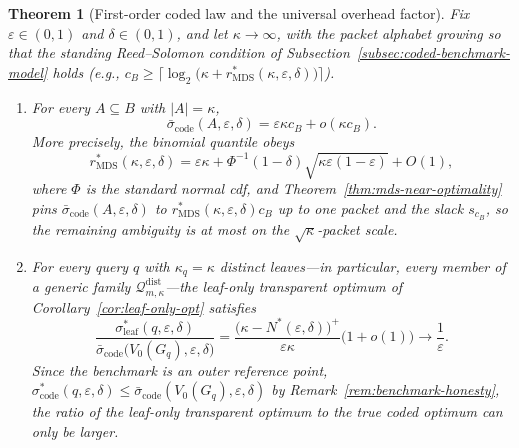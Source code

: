 \documentclass[journal]{IEEEtran}
\newcommand{\Qdist}{\mathcal Q_{m,\kappa}^{\mathrm{dist}}}
\newtheorem{theorem}{Theorem}[section]
\numberwithin{equation}{section}
\begin{document}
\begin{theorem}[First-order coded law and the universal overhead factor]
\label{thm:first-order-overhead-law}
Fix \(\varepsilon\in(0,1)\) and \(\delta\in(0,1)\), and let
\(\kappa\to\infty\), with the packet alphabet growing so that the standing
Reed--Solomon condition of
Subsection~\ref{subsec:coded-benchmark-model} holds (e.g.,
\(c_B\ge\bigl\lceil\log_2\bigl(\kappa+r_{\mathrm{MDS}}^*
(\kappa,\varepsilon,\delta)\bigr)\bigr\rceil\)).
\begin{enumerate}[label=\textup{(\alph*)}]
\item For every \(A\subseteq B\) with \(|A|=\kappa\),
\begin{equation}
  \bar\sigma_{\mathrm{code}}(A,\varepsilon,\delta)
  =
  \varepsilon\kappa c_B+o(\kappa c_B).
\label{eq:first-order-coded}
\end{equation}
More precisely, the binomial quantile obeys
\begin{equation}
  r_{\mathrm{MDS}}^*(\kappa,\varepsilon,\delta)
  =
  \varepsilon\kappa
  +
  \Phi^{-1}(1-\delta)\sqrt{\kappa\varepsilon(1-\varepsilon)}
  +
  O(1),
\label{eq:rstar-second-order}
\end{equation}
where \(\Phi\) is the standard normal cdf, and
Theorem~\ref{thm:mds-near-optimality} pins
\(\bar\sigma_{\mathrm{code}}(A,\varepsilon,\delta)\) to
\(r_{\mathrm{MDS}}^*(\kappa,\varepsilon,\delta)c_B\) up to one packet and the
slack \(s_{c_B}\), so the remaining ambiguity is at most on the
\(\sqrt{\kappa}\)-packet scale.
\item For every query \(q\) with \(\kappa_q=\kappa\) distinct leaves---in
particular, every member of a generic family \(\Qdist\)---the leaf-only
transparent optimum of Corollary~\ref{cor:leaf-only-opt} satisfies
\begin{equation}
  \frac{\sigma_{\mathrm{leaf}}^*(q,\varepsilon,\delta)}
       {\bar\sigma_{\mathrm{code}}\bigl(V_0(G_q),\varepsilon,\delta\bigr)}
  \!=\!
  \frac{\bigl(\kappa\!-\!N^*(\varepsilon,\delta)\bigr)^+}{\varepsilon\kappa}
  \bigl(1+o(1)\bigr)
  \longrightarrow
  \frac{1}{\varepsilon}.
\label{eq:universal-overhead-factor}
\end{equation}
Since the benchmark is an outer reference point,
\(\sigma_{\mathrm{code}}^*(q,\varepsilon,\delta)
\le\bar\sigma_{\mathrm{code}}(V_0(G_q),\varepsilon,\delta)\) by
Remark~\ref{rem:benchmark-honesty}, the ratio of the leaf-only transparent
optimum to the \emph{true} coded optimum can only be larger.
\end{enumerate}
\end{theorem}
\end{document}
